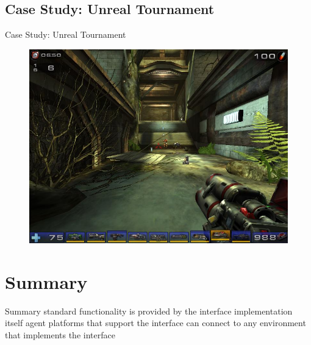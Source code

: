 \documentclass[t]{beamer}
\begin{document}
\subsection{Case Study: Unreal Tournament}
\begin{frame}{Case Study: Unreal Tournament}
	\begin{figure}
		\includegraphics[width=0.6\linewidth]{ut2004}
	\end{figure}
\end{frame}
\section{Summary}
\begin{frame}{Summary}
	standard functionality is provided by the interface implementation itself
	agent platforms that support the interface can connect to any environment that implements the interface
\end{frame}
\end{document}
